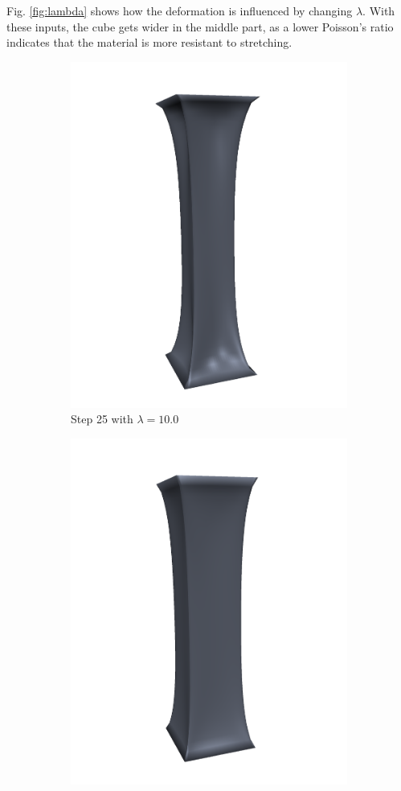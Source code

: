 Fig. \ref{fig:lambda} shows how the deformation is influenced by changing $\lambda$. With these inputs, the cube gets wider in the middle part, as a lower Poisson's ratio indicates that the material is more resistant to stretching.
\begin{figure}[!ht]
\centering
\begin{subfigure}{.47\textwidth}
  \centering
  \includegraphics[width=.75\linewidth]{resources/lambda_comparison_res.png}  
  \caption{Step 25 with $\lambda = 10.0$}
  \label{fig:lambda_1}
\end{subfigure}
\begin{subfigure}{.47\textwidth}
  \centering
  \includegraphics[width=.75\linewidth]{resources/lambda_comparison_lambda.png}  

\end{subfigure}
\end{figure}
